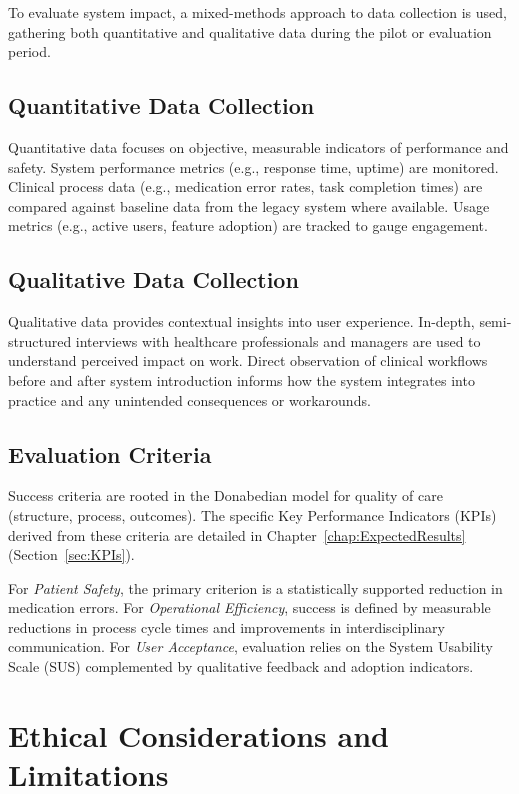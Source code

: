 To evaluate system impact, a mixed-methods approach to data collection is used, gathering both quantitative and qualitative data during the pilot or evaluation period.

\subsection{Quantitative Data Collection}
Quantitative data focuses on objective, measurable indicators of performance and safety. System performance metrics (e.g., response time, uptime) are monitored. Clinical process data (e.g., medication error rates, task completion times) are compared against baseline data from the legacy system where available. Usage metrics (e.g., active users, feature adoption) are tracked to gauge engagement.

\subsection{Qualitative Data Collection}
Qualitative data provides contextual insights into user experience. In-depth, semi-structured interviews with healthcare professionals and managers are used to understand perceived impact on work. Direct observation of clinical workflows before and after system introduction informs how the system integrates into practice and any unintended consequences or workarounds.

\subsection{Evaluation Criteria}
Success criteria are rooted in the Donabedian model for quality of care (structure, process, outcomes). The specific Key Performance Indicators (KPIs) derived from these criteria are detailed in Chapter~\ref{chap:ExpectedResults} (Section~\ref{sec:KPIs}).

For \textit{Patient Safety}, the primary criterion is a statistically supported reduction in medication errors. For \textit{Operational Efficiency}, success is defined by measurable reductions in process cycle times and improvements in interdisciplinary communication. For \textit{User Acceptance}, evaluation relies on the System Usability Scale (SUS) complemented by qualitative feedback and adoption indicators.

\section{Ethical Considerations and Limitations}

